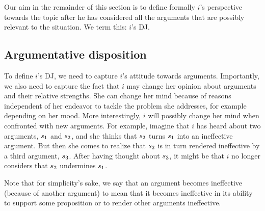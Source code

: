 \documentclass[version=3.21, pagesize, twoside=off, bibliography=totoc, DIV=calc, fontsize=12pt, a4paper]{scrartcl}
\begin{document}
Our aim in the remainder of this section is to define formally $i$’s perspective towards the topic after he has considered all the arguments that are possibly relevant to the situation. We term this: $i$'s \ac{DJ}.

\subsection{Argumentative disposition}
\label{sec:AS}
To define $i$’s \ac{DJ}, we need to capture $i$'s attitude towards arguments. Importantly, we also need to capture the fact that $i$ may change her opinion about arguments and their relative strengths. She can change her mind because of reasons independent of her endeavor to tackle the problem she addresses, for example depending on her mood.
More interestingly, $i$ will possibly change her mind when confronted with new arguments. For example, imagine that $i$ has heard about two arguments, $s_1$ and $s_2$, and she thinks that $s_2$ turns $s_1$ into an ineffective argument. But then she comes to realize that $s_2$ is in turn rendered ineffective by a third argument, $s_3$. After having thought about $s_3$, it might be that $i$ no longer considers that $s_2$ undermines $s_1$.

Note that for simplicity's sake, we say that an argument becomes ineffective (because of another argument) to mean that it becomes ineffective in its ability to support some proposition or to render other arguments ineffective.
\end{document}
